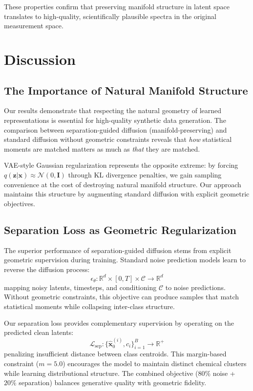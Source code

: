 \documentclass[sigconf]{acmart}
\begin{document}
These properties confirm that preserving manifold structure in latent space translates to high-quality, scientifically plausible spectra in the original measurement space.

\section{Discussion}

\subsection{The Importance of Natural Manifold Structure}

Our results demonstrate that respecting the natural geometry of learned representations is essential for high-quality synthetic data generation. The comparison between separation-guided diffusion (manifold-preserving) and standard diffusion without geometric constraints reveals that \textit{how} statistical moments are matched matters as much as \textit{that} they are matched.

VAE-style Gaussian regularization represents the opposite extreme: by forcing $q(\mathbf{z}|\mathbf{x}) \approx \mathcal{N}(0, \mathbf{I})$ through KL divergence penalties, we gain sampling convenience at the cost of destroying natural manifold structure. Our approach maintains this structure by augmenting standard diffusion with explicit geometric objectives.

\subsection{Separation Loss as Geometric Regularization}

The superior performance of separation-guided diffusion stems from explicit geometric supervision during training. Standard noise prediction models learn to reverse the diffusion process:
\begin{equation}
\epsilon_\theta: \mathbb{R}^d \times [0,T] \times \mathcal{C} \to \mathbb{R}^d
\end{equation}
mapping noisy latents, timesteps, and conditioning $\mathcal{C}$ to noise predictions. Without geometric constraints, this objective can produce samples that match statistical moments while collapsing inter-class structure.

Our separation loss provides complementary supervision by operating on the predicted clean latents:
\begin{equation}
\mathcal{L}_{\text{sep}}: \{\hat{\mathbf{x}}_0^{(i)}, c_i\}_{i=1}^B \to \mathbb{R}^+
\end{equation}
penalizing insufficient distance between class centroids. This margin-based constraint ($m=5.0$) encourages the model to maintain distinct chemical clusters while learning distributional structure. The combined objective ($80\%$ noise + $20\%$ separation) balances generative quality with geometric fidelity.
\end{document}
